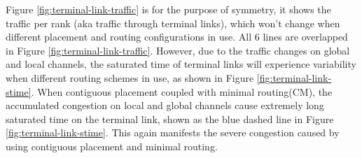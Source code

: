 \documentclass[conference,compsoc]{IEEEtran}
\newcommand{\NOTE}[1]{\hl {NOTE: #1}}
\begin{document}
Figure \ref{fig:terminal-link-traffic} is for the purpose of symmetry, it shows the traffic per rank (aka traffic through terminal links), which won't change when different placement and routing configurations in use. All 6 lines are overlapped in Figure \ref{fig:terminal-link-traffic}. However, due to the traffic changes on global and local channels, the saturated time of terminal links will experience variability when different routing schemes in use, as shown in Figure \ref{fig:terminal-link-stime}. When contiguous placement coupled with minimal routing(CM), the accumulated congestion on local and global channels cause extremely long saturated time on the terminal link, shown as the blue dashed line in Figure \ref{fig:terminal-link-stime}. This again manifests the severe congestion caused by using contiguous placement and minimal routing. 


 



\end{document}
